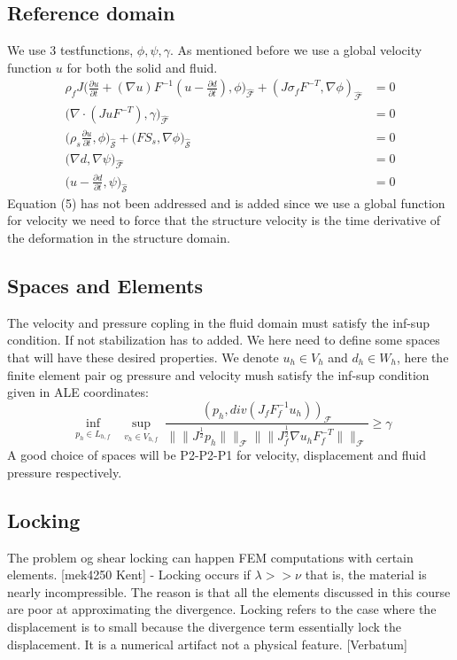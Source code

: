 \subsection*{Reference domain}
We use 3 testfunctions, $\phi, \psi, \gamma$. As mentioned before we use a global velocity function $u$ for both the solid and fluid.
\begin{align}
\rho_f J \big( \frac{\partial u}{\partial t} + (\nabla u)F^{-1}(u-\frac{\partial d}{\partial t}) , \phi\big)_{\mathcal{\hat{F}}} + (J\sigma_f F^{-T},\nabla \phi )_{\mathcal{\hat{F}}} &= 0  \\
 \big( \nabla \cdot (J u F^{-T}),\gamma \big)_{\mathcal{\hat{F}}} &= 0 \\
\big(\rho_s \frac{\partial u}{\partial t},\phi \big)_{\mathcal{\hat{S}}} + \big(F S_s, \nabla \phi \big)_{\mathcal{\hat{S}}} &=0 \\
 \big( \nabla d , \nabla \psi \big)_{\mathcal{\hat{F}}} &= 0 \\
 \big( u- \frac{\partial d}{\partial t} ,\psi \big)_{\mathcal{\hat{S}}} &= 0 
\end{align}
Equation (5) has not been addressed and is added since we use a global function for velocity we need to force that the structure velocity is the time derivative of the deformation in the structure domain. 

\subsection*{Spaces and Elements}
The velocity and pressure copling in the fluid domain must satisfy the inf-sup condition. If not stabilization has to added. We here need to define some spaces that will have these desired properties.
We denote $u_h \in V_h$ and $ d_h \in W_h $, here the finite element pair og pressure and velocity mush satisfy the inf-sup condition given in ALE coordinates:
$$   \inf_{\substack{p_h \in L_{h,f}}}  \sup_{\substack{v_h \in V_{h,f}}} \frac{ (p_h, div(J_f F_f^{-1} u_h))_{\mathcal{F}} }{ \|\|J^{\frac{1}{2}} p_h  \|\|_{\mathcal{F}} \|\|  J^{\frac{1}{2}}_{f} \nabla u_h F_f^{-T} \|\|_{\mathcal{F}}  } \geq \gamma     $$
A good choice of spaces will be P2-P2-P1 for velocity, displacement and fluid pressure respectively. 

\subsection*{Locking}
The problem og shear locking can happen FEM computations with certain elements. 
[mek4250 Kent] - Locking occurs if  $ \lambda >> \nu $ that is, the material is nearly incompressible. The reason is that all the elements discussed in this course are poor at approximating the divergence. Locking refers to the case where the displacement is to small because the divergence term essentially lock the displacement. It is a numerical artifact not a physical feature. [Verbatum]


